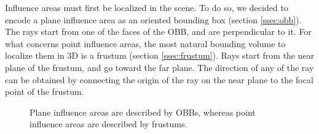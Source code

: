 \documentclass{PoliMi_MasterThesis}
\begin{document}
Influence areas must first be localized in the scene. To do so, we decided to encode a plane influence area as an oriented bounding box (section \ref{ssec:obb}). The rays start from one of the faces of the OBB, and are perpendicular to it. For what concerns point influence areas, the most natural bounding volume to localize them in 3D is a frustum (section \ref{ssec:frustum}). Rays start from the near plane of the frustum, and go toward the far plane. The direction of any of the ray can be obtained by connecting the origin of the ray on the near plane to the focal point of the frustum.

\begin{figure}[H]
    \centering
	\qquad
    \caption{Plane influence areas are described by OBBs, whereas point influence areas are described by frustums.}
    \label{fig:influence_areas}
\end{figure}
\end{document}
